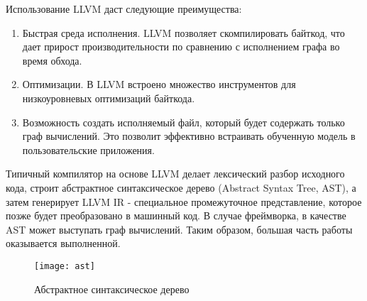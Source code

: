 \par
Использование LLVM даст следующие преимущества:
\begin{enumerate}
    \item Быстрая среда исполнения. LLVM позволяет скомпилировать байткод, что дает прирост производительности по сравнению с исполнением графа во время обхода.
    \item Оптимизации. В LLVM встроено множество инструментов для низкоуровневых оптимизаций байткода.
    \item Возможность создать исполняемый файл, который будет содержать только граф вычислений. Это позволит эффективно встраивать обученную модель в пользовательские приложения.
\end{enumerate}
\par
Типичный компилятор на основе LLVM делает лексический разбор исходного кода, строит абстрактное синтаксическое дерево (Abstract Syntax Tree, AST), а затем генерирует LLVM IR - специальное промежуточное представление, которое позже будет преобразовано в машинный код. В случае фреймворка, в качестве AST может выступать граф вычислений. Таким образом, большая часть работы оказывается выполненной.
\begin{figure}[h]
    \centering
    \texttt{[image: ast]}
    \caption{Абстрактное синтаксическое дерево}
    \label{task:ast}
\end{figure}
